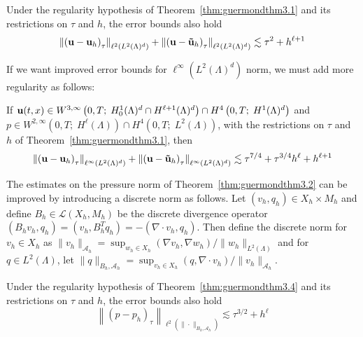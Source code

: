 \documentclass[letterpaper]{erdc}
\begin{document}
\begin{theorem}\label{thm:guermondthm3.3}
Under the regularity hypothesis of Theorem~\ref{thm:guermondthm3.1} and its restrictions on $\tau$ and $h$, the error bounds also hold
    \begin{equation}
      \left\| \left(\textbf{u} - \textbf{u}_h \right)_{\tau} \right\|_{\ell^{2}\left(L^2(\Lambda)^d\right)} + \left\| \left(\textbf{u} - \mathbf{\tilde{u}}_h \right)_{\tau} \right\|_{\ell^{2}\left(L^2(\Lambda)^d\right)} \lesssim \tau^2 + h^{\ell+1}
    \end{equation}
\end{theorem}

If we want improved error bounds for $\ell^{\infty}\left( L^2(\Lambda)^d \right)$ norm, we must add more regularity as follows:
\begin{theorem}\label{thm:guermondthm3.4}
If $\textbf{u}(t,x)\in W^{3,\infty}\left(0,T;\; H_0^1(\Lambda)^d \cap H^{\ell+1}(\Lambda)^d  \right) \cap H^4\left(0,T;\; H^1(\Lambda)^d\right)$ and $p\in W^{2,\infty}\left(0,T;\; H^{\ell}(\Lambda) \right)\cap H^4\left(0,T;\; L^2(\Lambda)\right)$, with the restrictions on $\tau$ and $h$ of Theorem~\ref{thm:guermondthm3.1}, then
  \begin{equation}
    \left\| \left(\textbf{u} - \textbf{u}_h \right)_{\tau} \right\|_{\ell^{\infty}\left(L^2(\Lambda)^d\right)} + \left\| \left(\textbf{u} - \mathbf{\tilde{u}}_h \right)_{\tau} \right\|_{\ell^{\infty}\left(L^2(\Lambda)^d\right)} \lesssim \tau^{7/4} + \tau^{3/4}h^{\ell} + h^{\ell+1}
  \end{equation}
\end{theorem}

The estimates on the pressure norm of Theorem~\ref{thm:guermondthm3.2} can be improved by introducing a discrete norm as follows.  Let $(v_h,q_h) \in X_h\times M_h$ and define $B_h \in \mathcal{L}(X_h,M_h)$ be the discrete divergence operator $(B_h v_h, q_h) = (v_h, B_h^T q_h) = -(\nabla\cdot v_h, q_h)$.  Then define the discrete norm for $v_h \in X_h$ as $\|v_h\|_{\mathcal{A}_h} = \sup_{w_h \in X_h} (\nabla v_h, \nabla w_h)/ \|w_h\|_{L^2(\Lambda)}$ and for $q\in L^2(\Lambda)$, let $\|q\|_{B_h, \mathcal{A}_h} = \sup_{v_h\in X_h} (q, \nabla\cdot v_h)/ \|v_h\|_{\mathcal{A}_h}$.

\begin{theorem}\label{thm:guermondthm3.5}
Under the regularity hypothesis of Theorem~\ref{thm:guermondthm3.4} and its restrictions on $\tau$ and $h$, the error bounds also hold
    \begin{equation}
      \left\| \left(p - p_h \right)_{\tau} \right\|_{\ell^{2}\left(\|\cdot\|_{B_h, \mathcal{A}_h}\right)} \lesssim \tau^{3/2} + h^{\ell}
    \end{equation}
\end{theorem}
\end{document}
